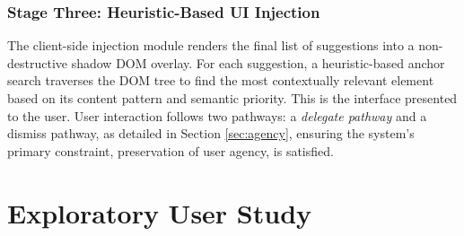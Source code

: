 \documentclass[sigconf]{acmart}
\begin{document}
\subsubsection{Stage Three: Heuristic-Based UI Injection}
The client-side injection module renders the final list of suggestions into a non-destructive shadow DOM overlay. For each suggestion, a heuristic-based anchor search traverses the DOM tree to find the most contextually relevant element based on its content pattern and semantic priority. This is the interface presented to the user. User interaction follows two pathways: a \emph{delegate pathway} and a dismiss pathway, as detailed in Section \ref{sec:agency}, ensuring the system's primary constraint, preservation of user agency, is satisfied.

\section{Exploratory User Study}

\end{document}
